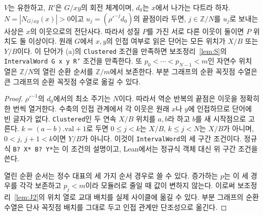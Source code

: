 \begin{lemma}
\label{lem:neighbor_word}
\leanok
\(V\)는 유한하고, \(R'\)은 \(G/xy\)의 회전 체계이며, \(d_0\)는 \(x\)에서 나가는 다트라 하자.
\(N=|N_{G/xy}(x)|>0\)이고 \(u_j=(\rho'^{-j}d_0)\)의 끝점이라 두면,
\(j\in\mathbb Z/N\)를 \(u_j\)로 보내는 사상은 \(x\)의 이웃으로의 전단사다.
따라서 성질 \(P\)를 가진 서로 다른 이웃이 둘이면 \(P\) 위치도 둘 이상이다.
원래 \(G\)에서 \(x,y\)의 인접 여부로 읽은 단어는 모든 위치가 \(X/B\) 또는 \(Y/B\)이다.
이 단어가 (a)의 \texttt{Clustered} 조건을 만족하면 보조정리~\ref{lem:S}의
\texttt{IntervalWord G x y R'} 조건을 만족한다.
또 \(p_0<\cdots<p_{N-1}<m\)인 자연수 위치 열은 \(\mathbb Z/N\)의 열린 순환 순서를
\(\mathbb Z/m\)에서 보존한다.
부분 그래프의 순환 꼭짓점 수열은 큰 그래프의 순환 꼭짓점 수열로 옮길 수 있다.
\end{lemma}

\begin{proof}
\leanok
\(\rho'^{-1}\)의 \(d_0\)에서의 최소 주기는 \(N\)이다. 따라서 역순 반복의 끝점은 이웃을 정확히 한 번씩
열거한다. 수축의 인접 관계에서 각 이웃은 원래 \(x\)나 \(y\)에 인접하므로 단어에 빈 글자가 없다.
\texttt{Clustered}인 두 연속 \(X/B\) 위치를 \(a,b\)라 하고 \(b\)를 새 시작점으로 고른다.
\(k=(a-b).\mathrm{val}+1\)로 두면 \(0\le j<k\)는 \(X/B\), \(k\le j<N\)는 \(X/B\)가 아니며,
\(0<j\), \(j+1<k\)이면 \(Y/B\)가 아니다. 이것이 \texttt{IntervalWord}의 세 구간 조건이다.
정규식 \texttt{B? X* B? Y*}는 이 조건의 설명이고, Lean에서는 정규식 객체 대신 위 구간 조건을 쓴다.

열린 순환 순서는 정수 대표의 세 가지 순서 경우로 쓸 수 있다.
증가하는 \(p\)는 이 세 경우를 각각 보존하고 \(p_j<m\)이라 모듈러로 줄일 때 값이 변하지 않는다.
이로써 보조정리~\ref{lem:J2}의 위치 열로 교대 배치를 실제 사이클에 옮길 수 있다.
부분 그래프의 순환 수열은 단사 꼭짓점 배치를 그대로 두고 인접 관계만 단조성으로 옮긴다.
\end{proof}
